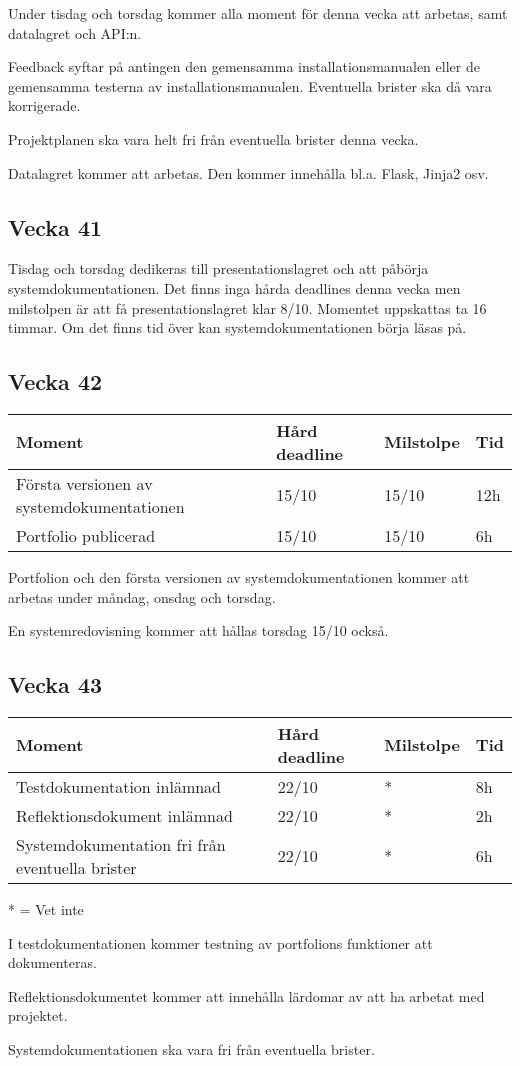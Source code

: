 \documentclass{TDP003mall}
\begin{document}
Under tisdag och torsdag kommer alla moment för denna vecka att arbetas, samt datalagret och API:n. 

Feedback syftar på antingen den gemensamma installationsmanualen eller de gemensamma testerna av installationsmanualen. Eventuella brister ska då vara korrigerade.

Projektplanen ska vara helt fri från eventuella brister denna vecka.

Datalagret kommer att arbetas. Den kommer innehålla bl.a. Flask, Jinja2 osv.

\subsection*{Vecka 41}
Tisdag och torsdag dedikeras till presentationslagret och att påbörja systemdokumentationen. Det finns inga hårda deadlines denna vecka men milstolpen är att få presentationslagret klar 8/10. Momentet uppskattas ta 16 timmar. Om det finns tid över kan systemdokumentationen börja läsas på.

\subsection*{Vecka 42}
\begin{table}[!h]
\begin{tabularx}{\linewidth}{|X|l|l|l|}
\hline
Moment & Hård deadline & Milstolpe & Tid \\\hline
Första versionen av systemdokumentationen & 15/10 & 15/10 & 12h \\\hline
Portfolio publicerad & 15/10 & 15/10 & 6h \\\hline
\end{tabularx}
\end{table}

Portfolion och den första versionen av systemdokumentationen kommer att arbetas under måndag, onsdag och torsdag.

En systemredovisning kommer att hållas torsdag 15/10 också.

\subsection*{Vecka 43}
\begin{table}[!h]
\begin{tabularx}{\linewidth}{|X|l|l|l|}
\hline
Moment & Hård deadline & Milstolpe & Tid \\\hline
Testdokumentation inlämnad & 22/10 & * & 8h \\\hline
Reflektionsdokument inlämnad & 22/10 & * & 2h \\\hline
Systemdokumentation fri från eventuella brister & 22/10 & * & 6h \\\hline
\end{tabularx}
\end{table}
* = Vet inte

I testdokumentationen kommer testning av portfolions funktioner att dokumenteras.

Reflektionsdokumentet kommer att innehålla lärdomar av att ha arbetat med projektet.

Systemdokumentationen ska vara fri från eventuella brister.
\end{document}
